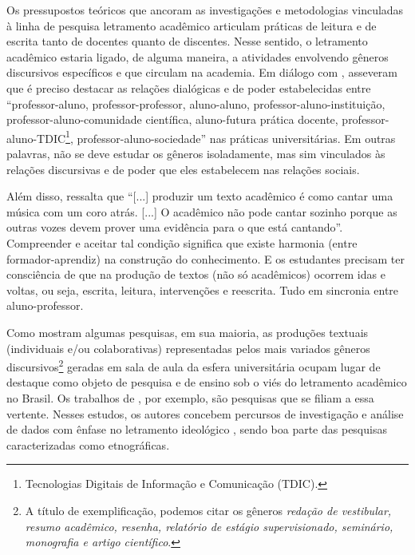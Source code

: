 \documentclass{textolivre}
\begin{document}
Os pressupostos teóricos que ancoram as investigações e metodologias vinculadas à linha de pesquisa letramento acadêmico articulam práticas de leitura e de escrita tanto de docentes quanto de discentes. Nesse sentido, o letramento acadêmico estaria ligado, de alguma maneira, a atividades envolvendo gêneros discursivos específicos e que circulam na academia. Em diálogo com \textcite{lillis_student_2003}, \textcite[p. 37]{fiad_letramentos_2014} asseveram que é preciso destacar as relações dialógicas e de poder estabelecidas entre “professor-aluno, professor-professor, aluno-aluno, professor-aluno-instituição, professor-aluno-comunidade científica, aluno-futura prática docente, professor-aluno-TDIC\footnote{Tecnologias Digitais de Informação e Comunicação (TDIC).}, professor-aluno-sociedade” nas práticas universitárias. Em outras palavras, não se deve estudar os gêneros isoladamente, mas sim vinculados às relações discursivas \cite{lillis_student_2003} e de poder que eles estabelecem nas relações sociais.

Além disso, \textcite[p. 76]{zavala_quem_2010} ressalta que “[...] produzir um texto acadêmico é como cantar uma música com um coro atrás. [...] O acadêmico não pode cantar sozinho porque as outras vozes devem prover uma evidência para o que está cantando”. Compreender e aceitar tal condição significa que existe harmonia (entre formador-aprendiz) na construção do conhecimento. E os estudantes precisam ter consciência de que na produção de textos (não só acadêmicos) ocorrem idas e voltas, ou seja, escrita, leitura, intervenções e reescrita. Tudo em sincronia entre aluno-professor.

Como mostram algumas pesquisas, em sua maioria, as produções textuais (individuais e/ou colaborativas) representadas pelos mais variados gêneros discursivos\footnote{A título de exemplificação, podemos citar os gêneros \textit{redação de vestibular, resumo acadêmico, resenha, relatório de estágio supervisionado, seminário, monografia e artigo científico}.} geradas em sala de aula da esfera universitária ocupam lugar de destaque como objeto de pesquisa e de ensino sob o viés do letramento acadêmico no Brasil. Os trabalhos de \textcite{marinho_escrita_2010, araujo_2013, fiad_letramentos_2014, santos_letramento_2020}, por exemplo, são pesquisas que se filiam a essa vertente. Nesses estudos, os autores concebem percursos de investigação e análise de dados com ênfase no letramento ideológico \cite{street_literacy_1984, street_letramentos_2014}, sendo boa parte das pesquisas caracterizadas como etnográficas.
\end{document}
